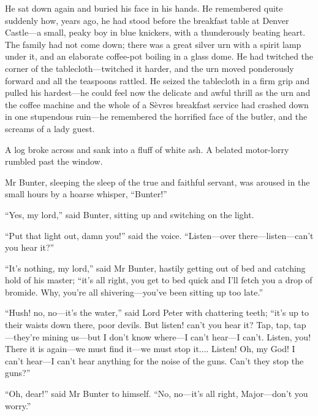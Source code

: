 He sat down again and buried his face in his hands. He remembered quite suddenly how, years ago, he had stood before the breakfast table at Denver Castle\allowbreak---\allowbreak a small, peaky boy in blue knickers, with a thunderously beating heart. The family had not come down; there was a great silver urn with a spirit lamp under it, and an elaborate coffee-pot boiling in a glass dome. He had twitched the corner of the tablecloth\allowbreak---\allowbreak twitched it harder, and the urn moved ponderously forward and all the teaspoons rattled. He seized the tablecloth in a firm grip and pulled his hardest\allowbreak---\allowbreak he could feel now the delicate and awful thrill as the urn and the coffee machine and the whole of a Sèvres breakfast service had crashed down in one stupendous ruin\allowbreak---\allowbreak he remembered the horrified face of the butler, and the screams of a lady guest.

A log broke across and sank into a fluff of white ash. A belated motor-lorry rumbled past the window.

Mr Bunter, sleeping the sleep of the true and faithful servant, was aroused in the small hours by a hoarse whisper, \enquote{Bunter!}

\enquote{Yes, my lord,} said Bunter, sitting up and switching on the light.

\enquote{Put that light out, damn you!} said the voice. \enquote{Listen\allowbreak---\allowbreak over there\allowbreak---\allowbreak listen---can’t you hear it?}

\enquote{It’s nothing, my lord,} said Mr Bunter, hastily getting out of bed and catching hold of his master; \enquote{it’s all right, you get to bed quick and I’ll fetch you a drop of bromide. Why, you’re all shivering\allowbreak---\allowbreak you’ve been sitting up too late.}

\enquote{Hush! no, no\allowbreak---\allowbreak it’s the water,} said Lord Peter with chattering teeth; \enquote{it’s up to their waists down there, poor devils. But listen! can’t you hear it? Tap, tap, tap\allowbreak---\allowbreak they’re mining us\allowbreak---\allowbreak but I don’t know where\allowbreak---\allowbreak I can’t hear\allowbreak---\allowbreak I can’t. Listen, you! There it is again\allowbreak---\allowbreak we must find it\allowbreak---\allowbreak we must stop it.... Listen! Oh, my God! I can’t hear\allowbreak---\allowbreak I can’t hear anything for the noise of the guns. Can’t they stop the guns?}

\enquote{Oh, dear!} said Mr Bunter to himself. \enquote{No, no\allowbreak---\allowbreak it’s all right, Major\allowbreak---\allowbreak don’t you worry.}

